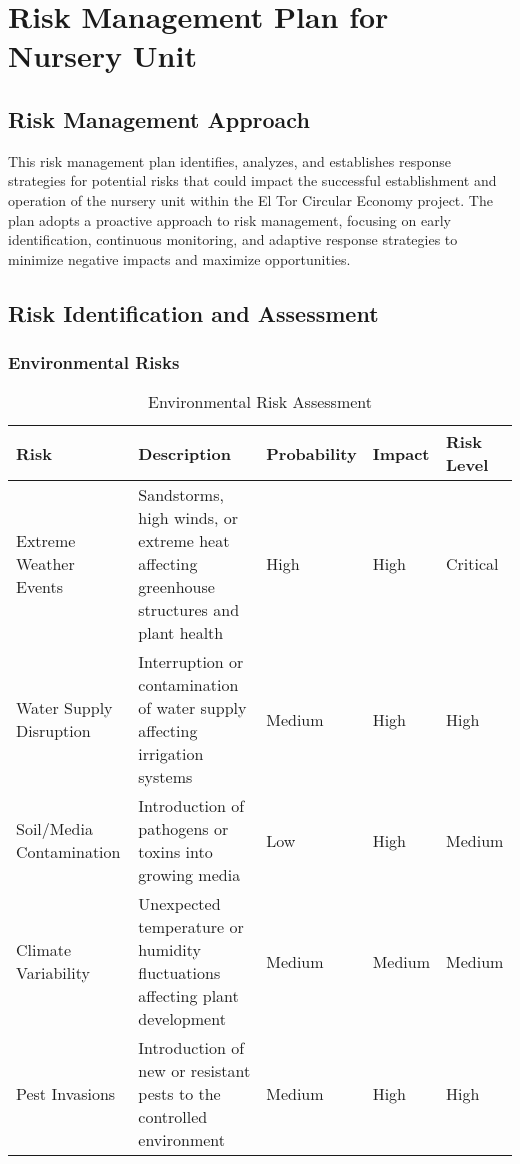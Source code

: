 \section{Risk Management Plan for Nursery Unit}

\subsection{Risk Management Approach}
This risk management plan identifies, analyzes, and establishes response strategies for potential risks that could impact the successful establishment and operation of the nursery unit within the El Tor Circular Economy project. The plan adopts a proactive approach to risk management, focusing on early identification, continuous monitoring, and adaptive response strategies to minimize negative impacts and maximize opportunities.

\subsection{Risk Identification and Assessment}

\subsubsection{Environmental Risks}

\begin{table}[h]
\centering
\begin{tabular}{|p{3cm}|p{4cm}|p{2cm}|p{2cm}|p{3cm}|}
\hline
\textbf{Risk} & \textbf{Description} & \textbf{Probability} & \textbf{Impact} & \textbf{Risk Level} \\
\hline
Extreme Weather Events & Sandstorms, high winds, or extreme heat affecting greenhouse structures and plant health & High & High & Critical \\
\hline
Water Supply Disruption & Interruption or contamination of water supply affecting irrigation systems & Medium & High & High \\
\hline
Soil/Media Contamination & Introduction of pathogens or toxins into growing media & Low & High & Medium \\
\hline
Climate Variability & Unexpected temperature or humidity fluctuations affecting plant development & Medium & Medium & Medium \\
\hline
Pest Invasions & Introduction of new or resistant pests to the controlled environment & Medium & High & High \\
\hline
\end{tabular}
\caption{Environmental Risk Assessment}
\end{table}

